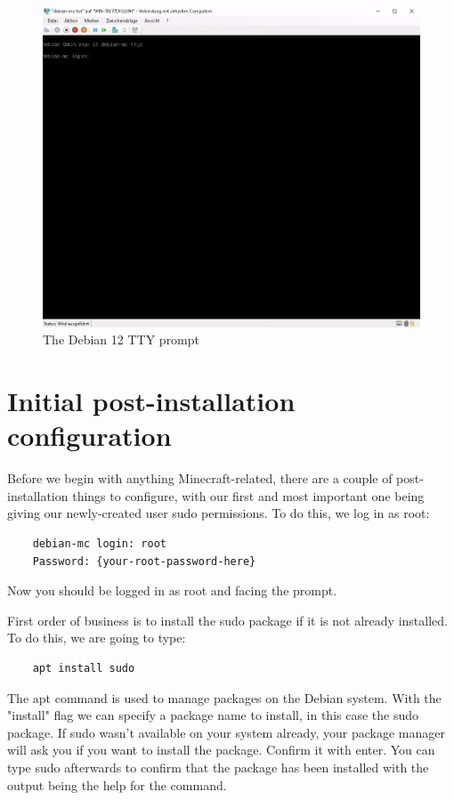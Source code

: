 \documentclass[]{article}
\begin{document}
\begin{figure}[h!]
	\caption{The Debian 12 TTY prompt}
	\centering
	\includegraphics[width=1\textwidth]{tty}
\end{figure}
\FloatBarrier

\section{Initial post-installation configuration}

Before we begin with anything Minecraft-related, there are a couple of post-installation things to configure, with our first and most important one being giving our newly-created user sudo permissions. To do this, we log in as root:

\begin{verbatim}
	debian-mc login: root
	Password: {your-root-password-here}
\end{verbatim}

Now you should be logged in as root and facing the prompt.

First order of business is to install the sudo package if it is not already installed. To do this, we are going to type:

\begin{verbatim}
	apt install sudo
\end{verbatim}

The apt command is used to manage packages on the Debian system. With the "install" flag we can specify a package name to install, in this case the sudo package. If sudo wasn't available on your system already, your package manager will ask you if you want to install the package. Confirm it with enter. You can type sudo afterwards to confirm that the package has been installed with the output being the help for the command.
\end{document}
